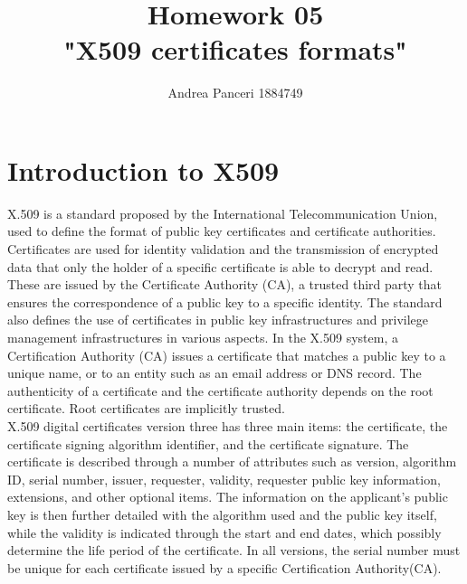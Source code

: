 \documentclass{article}
\title{Homework 05\\"X509 certificates formats"}
\author{Andrea Panceri 1884749}
\begin{document}
\maketitle

\section{Introduction to X509}
X.509 is a standard proposed by the International Telecommunication Union, used to define the format of public key certificates and certificate authorities. Certificates are used for identity validation and the transmission of encrypted data that only the holder of a specific certificate is able to decrypt and read. These are issued by the Certificate Authority (CA), a trusted third party that ensures the correspondence of a public key to a specific identity. The standard also defines the use of certificates in public key infrastructures and privilege management infrastructures in various aspects. In the X.509 system, a Certification Authority (CA) issues a certificate that matches a public key to a unique name, or to an entity such as an email address or DNS record. The authenticity of a certificate and the certificate authority depends on the root certificate. Root certificates are implicitly trusted.\\
X.509 digital certificates version three has three main items: the certificate, the certificate signing algorithm identifier, and the certificate signature. The certificate is described through a number of attributes such as version, algorithm ID, serial number, issuer, requester, validity, requester public key information, extensions, and other optional items. The information on the applicant's public key is then further detailed with the algorithm used and the public key itself, while the validity is indicated through the start and end dates, which possibly determine the life period of the certificate. In all versions, the serial number must be unique for each certificate issued by a specific Certification Authority(CA).
\end{document}
